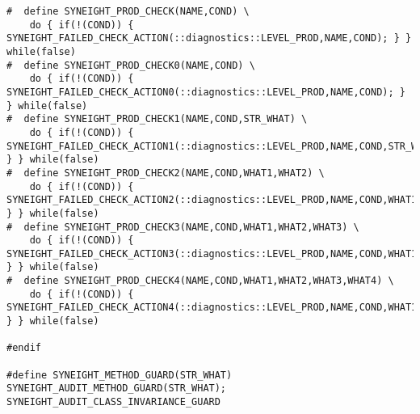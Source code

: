 \begin{verbatim}
#  define SYNEIGHT_PROD_CHECK(NAME,COND) \
    do { if(!(COND)) { SYNEIGHT_FAILED_CHECK_ACTION(::diagnostics::LEVEL_PROD,NAME,COND); } } while(false)
#  define SYNEIGHT_PROD_CHECK0(NAME,COND) \
    do { if(!(COND)) { SYNEIGHT_FAILED_CHECK_ACTION0(::diagnostics::LEVEL_PROD,NAME,COND); } } while(false)
#  define SYNEIGHT_PROD_CHECK1(NAME,COND,STR_WHAT) \
    do { if(!(COND)) { SYNEIGHT_FAILED_CHECK_ACTION1(::diagnostics::LEVEL_PROD,NAME,COND,STR_WHAT); } } while(false)
#  define SYNEIGHT_PROD_CHECK2(NAME,COND,WHAT1,WHAT2) \
    do { if(!(COND)) { SYNEIGHT_FAILED_CHECK_ACTION2(::diagnostics::LEVEL_PROD,NAME,COND,WHAT1,WHAT2); } } while(false)
#  define SYNEIGHT_PROD_CHECK3(NAME,COND,WHAT1,WHAT2,WHAT3) \
    do { if(!(COND)) { SYNEIGHT_FAILED_CHECK_ACTION3(::diagnostics::LEVEL_PROD,NAME,COND,WHAT1,WHAT2,WHAT3); } } while(false)
#  define SYNEIGHT_PROD_CHECK4(NAME,COND,WHAT1,WHAT2,WHAT3,WHAT4) \
    do { if(!(COND)) { SYNEIGHT_FAILED_CHECK_ACTION4(::diagnostics::LEVEL_PROD,NAME,COND,WHAT1,WHAT2,WHAT3,WHAT4); } } while(false)

#endif

#define SYNEIGHT_METHOD_GUARD(STR_WHAT) SYNEIGHT_AUDIT_METHOD_GUARD(STR_WHAT); SYNEIGHT_AUDIT_CLASS_INVARIANCE_GUARD 

\end{verbatim}

